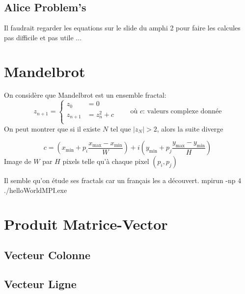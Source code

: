 \documentclass{article}
\begin{document}
\subsection{Alice Problem's}
\begin{resolution}
    Il faudrait regarder les equations sur le slide du amphi 2 pour faire les calcules pas difficile et pas utile
    ...
    
\end{resolution}

\section{Mandelbrot}
\begin{resolution}
    On considère que Mandelbrot est un ensemble fractal:
    \begin{equation}
        z_{n+1} = 
        \begin{cases}
            z_{0}   &= 0\\
            z_{n+1} &= z_{n}^{2} + c\\
        \end{cases}
        \qquad\text{où $c$: valeurs complexe donnée}
    \end{equation}
    On peut montrer que si il existe $N$ tel que $|z_N|>2$, alors la suite diverge

    \begin{equation}
        c = (x_{\min} + p_{i}\frac{x_{\max} - x_{\min}}{W}) + i(y_{\min} + p_{j}\frac{y_{\max} - y_{\min}}{H})
    \end{equation}
    Image de $W$ par $H$ pixels telle qu'à chaque pixel $(p_{i}, p_{j})$

    Il semble qu'on étude ses fractals car un français les a découvert.
    mpirun -np 4 ./helloWorldMPI.exe
\end{resolution}

\section{Produit Matrice-Vector}
\subsection{Vecteur Colonne}
\begin{resolution}
    
\end{resolution}

\subsection{Vecteur Ligne}
\begin{resolution}
    
\end{resolution}
\end{document}
